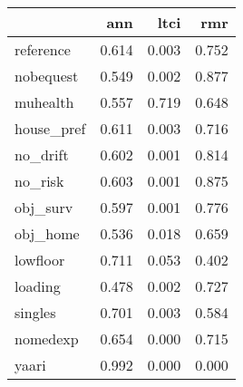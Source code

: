 \begin{tabular}{lrrr}
\toprule
{} &    ann &   ltci &    rmr \\
\midrule
reference  &  0.614 &  0.003 &  0.752 \\
nobequest  &  0.549 &  0.002 &  0.877 \\
muhealth   &  0.557 &  0.719 &  0.648 \\
house\_pref &  0.611 &  0.003 &  0.716 \\
no\_drift   &  0.602 &  0.001 &  0.814 \\
no\_risk    &  0.603 &  0.001 &  0.875 \\
obj\_surv   &  0.597 &  0.001 &  0.776 \\
obj\_home   &  0.536 &  0.018 &  0.659 \\
lowfloor   &  0.711 &  0.053 &  0.402 \\
loading    &  0.478 &  0.002 &  0.727 \\
singles    &  0.701 &  0.003 &  0.584 \\
nomedexp   &  0.654 &  0.000 &  0.715 \\
yaari      &  0.992 &  0.000 &  0.000 \\
\bottomrule
\end{tabular}
